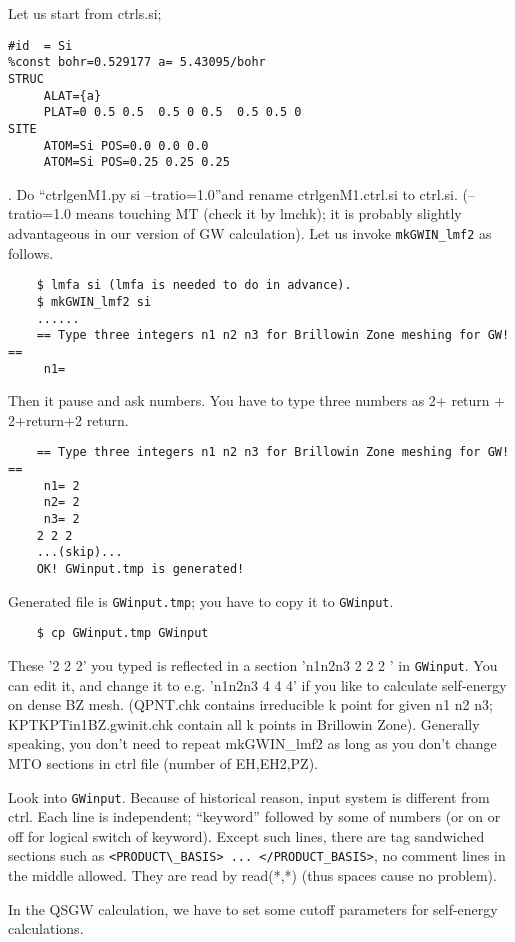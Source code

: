 \documentclass[a4paper,10pt,epsf,fleqn]{article}
\begin{document}
Let us start from ctrls.si;
\begin{verbatim}
#id  = Si
%const bohr=0.529177 a= 5.43095/bohr
STRUC
     ALAT={a} 
     PLAT=0 0.5 0.5  0.5 0 0.5  0.5 0.5 0 
SITE
     ATOM=Si POS=0.0 0.0 0.0
     ATOM=Si POS=0.25 0.25 0.25
\end{verbatim}
. Do ``ctrlgenM1.py si --tratio=1.0''and rename ctrlgenM1.ctrl.si to
ctrl.si. (--tratio=1.0 means touching MT (check it by lmchk); 
it is probably slightly advantageous in our version of GW calculation).
Let us invoke \verb+mkGWIN_lmf2+ as follows.
\begin{verbatim}
    $ lmfa si (lmfa is needed to do in advance).
    $ mkGWIN_lmf2 si
    ......
    == Type three integers n1 n2 n3 for Brillowin Zone meshing for GW! ==
     n1=
\end{verbatim}
Then it pause and ask numbers. You have to type three numbers as
2+ return + 2+return+2 return.
\begin{verbatim}
    == Type three integers n1 n2 n3 for Brillowin Zone meshing for GW! ==
     n1= 2
     n2= 2
     n3= 2
    2 2 2
    ...(skip)...
    OK! GWinput.tmp is generated!
\end{verbatim}
Generated file is \verb+GWinput.tmp+; you have to copy it to \verb+GWinput+.
\begin{verbatim}
    $ cp GWinput.tmp GWinput
\end{verbatim}
These '2 2 2' you typed is reflected in a section 'n1n2n3 2 2 2 ' in \verb+GWinput+.
You can edit it, and change it to e.g. 'n1n2n3 4 4 4' if you like to
calculate self-energy on dense BZ mesh. (QPNT.chk contains irreducible k
point for given n1 n2 n3; KPTKPTin1BZ.gwinit.chk contain all k points in
Brillowin Zone). Generally speaking, you don't need to repeat mkGWIN\_lmf2 
as long as you don't change MTO sections in ctrl file (number of EH,EH2,PZ).

Look into \verb+GWinput+. Because of historical reason,
input system is different from ctrl.
Each line is independent; ``keyword'' followed by some of numbers 
(or on or off for logical switch of keyword). 
Except such lines, there are tag sandwiched sections 
such as \verb+<PRODUCT\_BASIS> ... </PRODUCT_BASIS>+, 
no comment lines in the middle allowed. They are read by
read(*,*) (thus spaces cause no problem).

In the QSGW calculation, we have to set some cutoff parameters
for self-energy calculations.
\end{document}
